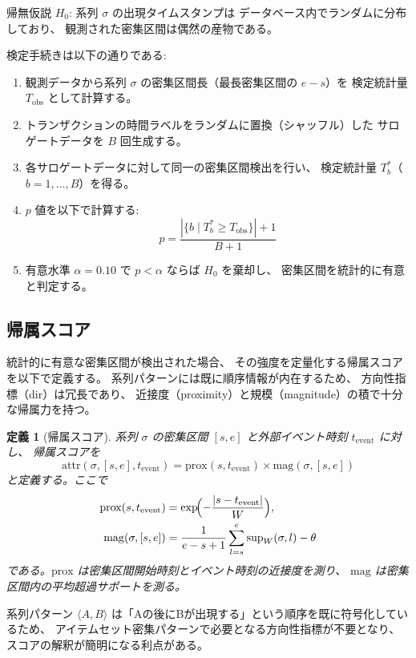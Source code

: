 \documentclass[11pt,a4paper]{article}
\newtheorem{definition}{定義}[section]
\begin{document}
帰無仮説 $H_0$: 系列 $\sigma$ の出現タイムスタンプは
データベース内でランダムに分布しており、
観測された密集区間は偶然の産物である。

検定手続きは以下の通りである:
\begin{enumerate}[leftmargin=2em]
  \item 観測データから系列 $\sigma$ の密集区間長（最長密集区間の $e - s$）を
        検定統計量 $T_{\mathrm{obs}}$ として計算する。
  \item トランザクションの時間ラベルをランダムに置換（シャッフル）した
        サロゲートデータを $B$ 回生成する。
  \item 各サロゲートデータに対して同一の密集区間検出を行い、
        検定統計量 $T_b^*$（$b = 1, \ldots, B$）を得る。
  \item $p$ 値を以下で計算する:
        \[
          p = \frac{|\{b \mid T_b^* \ge T_{\mathrm{obs}}\}| + 1}{B + 1}
        \]
  \item 有意水準 $\alpha = 0.10$ で $p < \alpha$ ならば $H_0$ を棄却し、
        密集区間を統計的に有意と判定する。
\end{enumerate}

\subsection{帰属スコア}

統計的に有意な密集区間が検出された場合、
その強度を定量化する帰属スコアを以下で定義する。
系列パターンには既に順序情報が内在するため、
方向性指標（dir）は冗長であり、
近接度（proximity）と規模（magnitude）の積で十分な帰属力を持つ。

\begin{definition}[帰属スコア]
\label{def:attribution}
系列 $\sigma$ の密集区間 $[s, e]$ と外部イベント時刻 $t_{\mathrm{event}}$ に対し、
帰属スコアを
\[
  \mathrm{attr}(\sigma, [s,e], t_{\mathrm{event}}) = \mathrm{prox}(s, t_{\mathrm{event}}) \times \mathrm{mag}(\sigma, [s,e])
\]
と定義する。ここで
\begin{align}
  \mathrm{prox}(s, t_{\mathrm{event}}) &= \exp\!\Bigl(-\frac{|s - t_{\mathrm{event}}|}{W}\Bigr), \\
  \mathrm{mag}(\sigma, [s,e]) &= \frac{1}{e - s + 1}\sum_{l=s}^{e} \mathrm{sup}_W(\sigma, l) - \theta
\end{align}
である。$\mathrm{prox}$ は密集区間開始時刻とイベント時刻の近接度を測り、
$\mathrm{mag}$ は密集区間内の平均超過サポートを測る。
\end{definition}

\noindent
系列パターン $\langle A, B \rangle$ は「Aの後にBが出現する」という順序を既に符号化しているため、
アイテムセット密集パターンで必要となる方向性指標が不要となり、
スコアの解釈が簡明になる利点がある。
\end{document}
